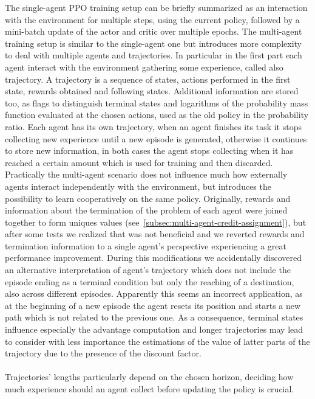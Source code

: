 \documentclass[11pt, a4paper, hidelinks]{report}
\begin{document}
The single-agent PPO training setup can be briefly summarized as an interaction with the environment for multiple steps, using the current policy, followed by a mini-batch update of the actor and critic over multiple epochs.
The multi-agent training setup is similar to the single-agent one but introduces more complexity to deal with multiple agents and trajectories.
In particular in the first part each agent interact with the environment gathering some experience, called also trajectory.
A trajectory is a sequence of states, actions performed in the first state, rewards obtained and following states.
Additional information are stored too, as flags to distinguish terminal states and logarithms of the probability mass function evaluated at the chosen actions, used as the old policy in the probability ratio.
Each agent has its own trajectory, when an agent finishes its task it stops collecting new experience until a new episode is generated, otherwise it continues to store new information, in both cases the agent stops collecting when it has reached a certain amount which is used for training and then discarded.
Practically the multi-agent scenario does not influence much how externally agents interact independently with the environment, but introduces the possibility to learn cooperatively on the same policy.
Originally, rewards and information about the termination of the problem of each agent were joined together to form uniques values (see~\ref{subsec:multi-agent-credit-assignment}), but after some tests we realized that was not beneficial and we reverted rewards and termination information to a single agent's perspective experiencing a great performance improvement.
During this modifications we accidentally discovered an alternative interpretation of agent's trajectory which does not include the episode ending as a terminal condition but only the reaching of a destination, also across different episodes.
Apparently this seems an incorrect application, as at the beginning of a new episode the agent resets its position and starts a new path which is not related to the previous one.
As a consequence, terminal states influence especially the advantage computation and longer trajectories may lead to consider with less importance the estimations of the value of latter parts of the trajectory due to the presence of the discount factor.%
\\
\\
Trajectories' lengths particularly depend on the chosen horizon, deciding how much experience should an agent collect before updating the policy is crucial.
\end{document}
